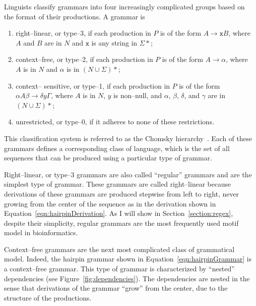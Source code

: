 Linguists classify grammars into four increasingly complicated
groups based on the format of their productions.  A grammar is
\begin{enumerate}
  \item right--linear, or type--3, if each production in $P$ is of the form
        $A\rightarrow \texttt{x}B$, where $A$ and $B$ are in  $N$
        and $\texttt{x}$ is any string in $\Sigma*$;\label{gramDefs}
  \item context--free, or type--2, if each production in $P$ is of the form
        $A\rightarrow \alpha$, where $A$ is in  $N$
        and $\alpha$ is  in $(N\cup\Sigma)*$;
  \item context-- sensitive, or type--1, if each production in $P$ is of the form
        $\alpha A\beta \rightarrow \delta y \Gamma$, where $A$ is in  $N$,
        $y$ is non--null, and $\alpha$,
        $\beta$, $\delta$, and $\gamma$ are  in $(N\cup\Sigma)*$;
  \item unrestricted, or type--0, if it adheres to none of these
        restrictions.
\end{enumerate}
This classification system is referred to as the Chomsky
hierarchy~\cite{chomsky1956three}. Each of these grammars defines a
corresponding class of language, which is the set of all sequences
that can be produced using a particular type of grammar.

Right--linear, or type--3 grammars are also called ``regular''
grammars and are the simplest type of grammar. These grammars are
called right--linear because derivations of these grammars are
produced stepwise from left to right, never growing from the center
of the sequence as in the derivation shown in
Equation~\ref{eqn:hairpinDerivation}.  As I will show in
Section~\vref{section:regex}, despite their simplicity, regular
grammars are the most frequently used motif model in bioinformatics.

Context--free grammars are the next most complicated class of
grammatical model.  Indeed, the hairpin grammar shown in
Equation~\vref{eqn:hairpinGrammar} is a context--free grammar.  This
type of grammar is characterized by ``nested'' dependencies (see
Figure~\ref{fig:dependencies}).  The dependencies are nested in the
sense that derivations of the grammar ``grow'' from the center, due
to the structure of the productions.



